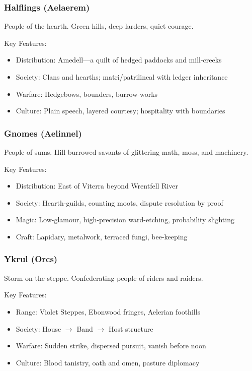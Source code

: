 \subsubsection{Halflings (Aelaerem)}
\label{sec:halflings}

People of the hearth. Green hills, deep larders, quiet courage.

Key Features:
\begin{itemize}
    \item Distribution: Amedell---a quilt of hedged paddocks and mill-creeks
    \item Society: Clans and hearths; matri/patrilineal with ledger inheritance
    \item Warfare: Hedgebows, bounders, burrow-works
    \item Culture: Plain speech, layered courtesy; hospitality with boundaries
\end{itemize}

\subsubsection{Gnomes (Aelinnel)}
\label{sec:gnomes}

People of sums. Hill-burrowed savants of glittering math, moss, and machinery.

Key Features:
\begin{itemize}
    \item Distribution: East of Viterra beyond Wrentfell River
    \item Society: Hearth-guilds, counting moots, dispute resolution by proof
    \item Magic: Low-glamour, high-precision ward-etching, probability slighting
    \item Craft: Lapidary, metalwork, terraced fungi, bee-keeping
\end{itemize}

\subsubsection{Ykrul (Orcs)}
\label{sec:ykrulpeoples}

Storm on the steppe. Confederating people of riders and raiders.

Key Features:
\begin{itemize}
    \item Range: Violet Steppes, Ebonwood fringes, Aelerian foothills
    \item Society: House $\rightarrow$ Band $\rightarrow$ Host structure
    \item Warfare: Sudden strike, dispersed pursuit, vanish before noon
    \item Culture: Blood tanistry, oath and omen, pasture diplomacy
\end{itemize}

